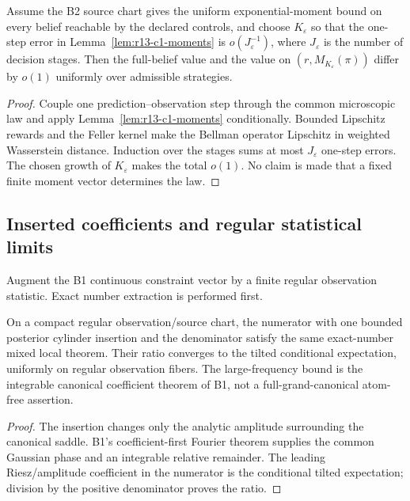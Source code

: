 \begin{theorem}
\label{thm:r13-c1-reduction}
Assume the B2 source chart gives the uniform exponential-moment bound on every
belief reachable by the declared controls, and choose
$K_\varepsilon$ so that the one-step error in
Lemma~\ref{lem:r13-c1-moments} is $o(J_\varepsilon^{-1})$, where
$J_\varepsilon$ is the number of decision stages.  Then the full-belief value
and the value on
$(r,M_{K_\varepsilon}(\pi))$ differ by $o(1)$ uniformly over admissible
strategies.
\end{theorem}

\begin{proof}
Couple one prediction--observation step through the common microscopic law and
apply Lemma~\ref{lem:r13-c1-moments} conditionally.  Bounded Lipschitz rewards
and the Feller kernel make the Bellman operator Lipschitz in weighted
Wasserstein distance.  Induction over the stages sums at most
$J_\varepsilon$ one-step errors.  The chosen growth of
$K_\varepsilon$ makes the total $o(1)$.  No claim is made that a fixed finite
moment vector determines the law.
\end{proof}

\subsection{Inserted coefficients and regular statistical limits}

Augment the B1 continuous constraint vector by a finite regular observation
statistic.  Exact number extraction is performed first.

\begin{theorem}
\label{thm:r13-c1-coefficient}
On a compact regular observation/source chart, the numerator with one bounded
posterior cylinder insertion and the denominator satisfy the same exact-number
mixed local theorem.  Their ratio converges to the tilted conditional
expectation, uniformly on regular observation fibers.  The large-frequency
bound is the integrable canonical coefficient theorem of B1, not a
full-grand-canonical atom-free assertion.
\end{theorem}

\begin{proof}
The insertion changes only the analytic amplitude surrounding the canonical
saddle.  B1's coefficient-first Fourier theorem supplies the common Gaussian
phase and an integrable relative remainder.  The leading Riesz/amplitude
coefficient in the numerator is the conditional tilted expectation; division
by the positive denominator proves the ratio.
\end{proof}

